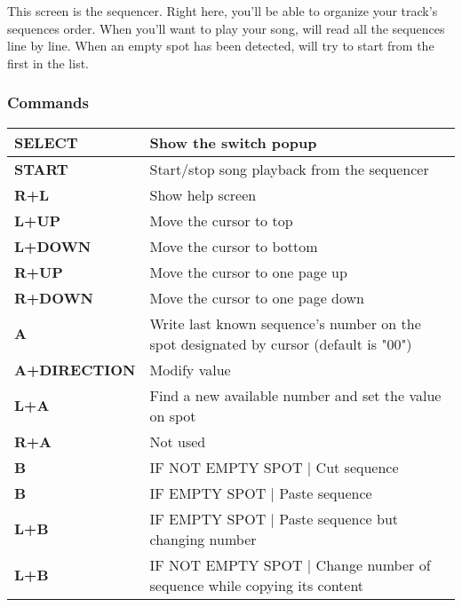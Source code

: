 This screen is the sequencer. Right here, you'll be able to organize your track's sequences order.
When you'll want to play your song, \FAT will read all the sequences line by line.
When an empty spot has been detected, \FAT will try to start from the first in the list.


\subsubsection{Commands}

\tablelasttail{\hline}
\begin{supertabular}{|l|p{11cm}|}
\hline
    {\bf SELECT} & Show the switch popup \\
    \hline
    {\bf START} & Start/stop song playback from the sequencer \\
    \hline
    {\bf R+L} & Show help screen \\
    \hline
    {\bf L+UP} & Move the cursor to top \\
    \hline
    {\bf L+DOWN} & Move the cursor to bottom \\
    \hline
    {\bf R+UP} & Move the cursor to one page up \\
    \hline
    {\bf R+DOWN} & Move the cursor to one page down \\
    \hline
    {\bf A} & Write last known sequence's number on the spot designated by cursor (default is "00") \\
    \hline
    {\bf A+DIRECTION} & Modify value \\
    \hline
    {\bf L+A} & Find a new available number and set the value on spot \\
    \hline
    {\bf R+A} & Not used \\
    \hline
    {\bf B} & IF NOT EMPTY SPOT | Cut sequence \\
    \hline
    {\bf B} & IF EMPTY SPOT | Paste sequence \\
    \hline
    {\bf L+B} & IF EMPTY SPOT | Paste sequence but changing number \\
    \hline
    {\bf L+B} & IF NOT EMPTY SPOT | Change number of sequence while copying its content \\
\end{supertabular}
